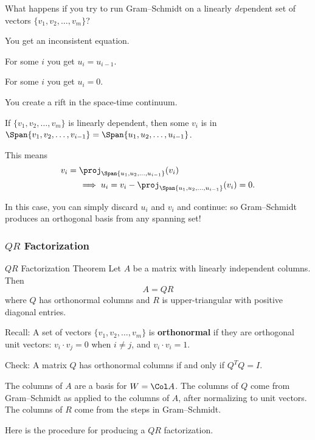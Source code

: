 \begin{pollframe}

\begin{poll}
\begin{bluebox}[Poll]{.8\linewidth}
  What happens if you try to run Gram--Schmidt on a linearly
  \emph{de\/}pendent set of vectors $\{v_1,v_2,\ldots,v_m\}$?
  \smallskip
  \begin{eAlpherate}
  \item You get an inconsistent equation.
  \item For some $i$ you get $u_i = u_{i-1}$.
  \item For some $i$ you get $u_i = 0$.
  \item You create a rift in the space-time continuum.
  \end{eAlpherate}
\end{bluebox}

\pause\bigskip
If $\{v_1,v_2,\ldots,v_m\}$ is linearly dependent, then some $v_i$ is in
$\Span\{v_1,v_2,\ldots,v_{i-1}\} = \Span\{u_1,u_2,\ldots,u_{i-1}\}$.  

\pause\medskip
This means\displayskips{1pt}
\[\begin{aligned} &v_i = \proj_{\Span\{u_1,u_2,\ldots,u_{i-1}\}}(v_i) \\
&\qquad\implies u_i = v_i - \proj_{\Span\{u_1,u_2,\ldots,u_{i-1}\}}(v_i) = 0. 
\end{aligned}\]

\pause\medskip
In this case, you can simply discard $u_i$ and $v_i$ and continue: so
Gram--Schmidt produces an orthogonal basis from any spanning set!
\end{poll}

\end{pollframe}



\begin{frame}
\frametitle{$QR$ Factorization}

\vskip-3mm
\begin{oneoffthm}{$QR$ Factorization Theorem}
  Let $A$ be a matrix with linearly independent columns.  Then
  \[ A = QR \]
  where $Q$ has orthonormal columns and $R$ is upper-triangular with positive
  diagonal entries.
\end{oneoffthm}

\pause\smallskip
\alert{Recall:} A set of vectors $\{v_1,v_2,\ldots,v_m\}$ is
\textbf{orthonormal} if they are orthogonal unit vectors: $v_i\cdot v_j = 0$
when $i\neq j$, and $v_i\cdot v_i = 1$.

\pause\medskip
\alert{Check:} A matrix $Q$ has orthonormal columns if and only if $Q^TQ = I$.

\pause\bigskip
The columns of $A$ are a basis for $W = \Col A$.
\pause
The columns of $Q$ come from Gram--Schmidt as applied to the columns of $A$,
after normalizing to unit vectors.
\pause
The columns of $R$ come from the steps in Gram--Schmidt.

\pause\medskip
Here is the procedure for producing a $QR$ factorization.

\end{frame}


